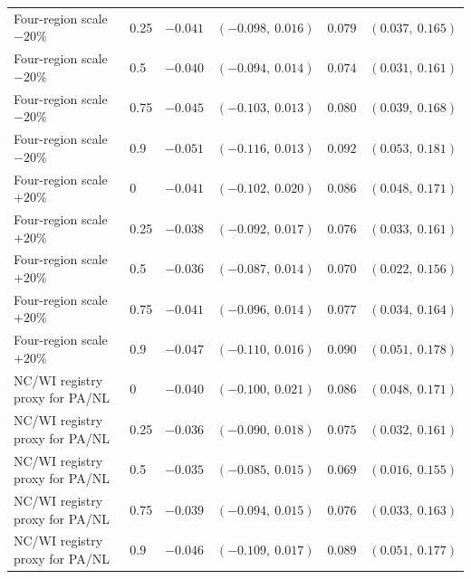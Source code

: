 \documentclass[11pt]{article}
\begin{document}
\begin{landscape}
\begin{table}[p]
\begin{tabular}{llrrrr}
Four-region scale $-20\%$ & 0.25 & $-0.041$ & $(-0.098,\ 0.016)$ & $0.079$ & $(0.037,\ 0.165)$ \\
Four-region scale $-20\%$ & 0.5 & $-0.040$ & $(-0.094,\ 0.014)$ & $0.074$ & $(0.031,\ 0.161)$ \\
Four-region scale $-20\%$ & 0.75 & $-0.045$ & $(-0.103,\ 0.013)$ & $0.080$ & $(0.039,\ 0.168)$ \\
Four-region scale $-20\%$ & 0.9 & $-0.051$ & $(-0.116,\ 0.013)$ & $0.092$ & $(0.053,\ 0.181)$ \\
Four-region scale $+20\%$ & 0 & $-0.041$ & $(-0.102,\ 0.020)$ & $0.086$ & $(0.048,\ 0.171)$ \\
Four-region scale $+20\%$ & 0.25 & $-0.038$ & $(-0.092,\ 0.017)$ & $0.076$ & $(0.033,\ 0.161)$ \\
Four-region scale $+20\%$ & 0.5 & $-0.036$ & $(-0.087,\ 0.014)$ & $0.070$ & $(0.022,\ 0.156)$ \\
Four-region scale $+20\%$ & 0.75 & $-0.041$ & $(-0.096,\ 0.014)$ & $0.077$ & $(0.034,\ 0.164)$ \\
Four-region scale $+20\%$ & 0.9 & $-0.047$ & $(-0.110,\ 0.016)$ & $0.090$ & $(0.051,\ 0.178)$ \\
NC/WI registry proxy for PA/NL & 0 & $-0.040$ & $(-0.100,\ 0.021)$ & $0.086$ & $(0.048,\ 0.171)$ \\
NC/WI registry proxy for PA/NL & 0.25 & $-0.036$ & $(-0.090,\ 0.018)$ & $0.075$ & $(0.032,\ 0.161)$ \\
NC/WI registry proxy for PA/NL & 0.5 & $-0.035$ & $(-0.085,\ 0.015)$ & $0.069$ & $(0.016,\ 0.155)$ \\
NC/WI registry proxy for PA/NL & 0.75 & $-0.039$ & $(-0.094,\ 0.015)$ & $0.076$ & $(0.033,\ 0.163)$ \\
NC/WI registry proxy for PA/NL & 0.9 & $-0.046$ & $(-0.109,\ 0.017)$ & $0.089$ & $(0.051,\ 0.177)$ \\
\bottomrule
\end{tabular}
\end{table}
\end{landscape}
\pdfpageattr{}
\end{document}
